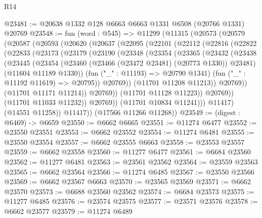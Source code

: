\begin{lexlean}{R14}
\begin{coremodule}
{{{{{{{{{{{{{{{{{{{{{{{{{{{{{{{{{{{{{{{{{{{{{{{{{{{{{{{{{{{{{{{{{{{{{{{{{{{{{{{{{{@23481 := @20638 @1332 @128 @6663 @6663 @1331 @6508 (@20766 @1331) @20769
@23548 := fun (word : @545) =>
  @11299
    (@11315
      (@20573
        (@20579
          (@20587
            (@20593
              (@20620
                (@20637
                  (@22095
                    (@22101
                      (@22112
                        (@22816
                          (@22822
                            (@22833
                              (@23173
                                (@23179
                                  (@23190
                                    (@23348
                                      (@23354
                                        (@23365
                                          (@23432
                                            (@23438
                                              (@23445
                                                (@23454
                                                  (@23460
                                                    (@23466 (@23472 @23481) (@20773 @1330))
                                                    @23481)
                                                  (@11604 @11189 @1330))
                                                (fun ("_" : @11193) => @20790 @1341)
                                                (fun ("_" : @11192 @11619) => @20795))
                                              @20769))
                                          (@11701 @11208 @11213))
                                        @20769))
                                    (@11701 @11171 @11214))
                                  @20769))
                              (@11701 @11128 @11223))
                            @20769))
                        (@11701 @11033 @11232))
                      @20769))
                  (@11701 @10834 @11241)))
              @11417)
            (@14551 @11258))
          @11417))
      (@17566 @11266 @11268))
@23549 := (digest : @6469) -> @6659
@23550 := @6662 @6665
@23551 := @11274 @6477
@23552 := @23550 @23551
@23553 := @6662 @23552
@23554 := @11274 @6481
@23555 := @23550 @23554
@23557 := @6662 @23555 @6663
@23558 := @23553 @23557
@23559 := @6662 @23558
@23560 := @11277 @6477
@23561 := @6684 @23560
@23562 := @11277 @6481
@23563 := @23561 @23562
@23564 := @23559 @23563
@23565 := @6662 @23564
@23566 := @11274 @6485
@23567 := @23550 @23566
@23569 := @6662 @23567 @6663
@23570 := @23565 @23569
@23571 := @6662 @23570
@23573 := @6688 @23560 @23562
@23574 := @6684 @23573
@23575 := @11277 @6485
@23576 := @23574 @23575
@23577 := @23571 @23576
@23578 := @6662 @23577
@23579 := @11274 @6489
}}}}}}}}}}}}}}}}}}}}}}}}}}}}}}}}}}}}}}}}}}}}}}}}}}}}}}}}}}}}}}}}}}}}}}}}}}}}}}}}}}
\end{coremodule}
\end{lexlean}
